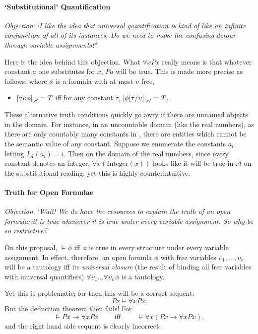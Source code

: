 \paragraph{`Substitutional' Quantification}

\emph{Objection}: `\emph{I like the idea that universal quantification is kind of like an infinite conjunction of all of its instances. Do we need to make the confusing detour through variable assignments?}'

Here is the idea behind this objection. What $\forall x Px$ really means is that whatever constant $a$ one substitutes for $x$, $Pa$ will be true. This is made more precise as follows: where $\phi$ is a formula with at most $\upsilon$ free, \begin{itemize}
	\item $\left|\forall \upsilon \phi\right|_{\mathscr{A}}=T$ iff for any constant $\tau$, $\left|\phi[\tau/\upsilon]\right|_{\mathscr{A}}=T$.
\end{itemize}
These alternative truth conditions quickly go awry if there are unnamed objects in the domain. For instance, in an uncountable domain (like the real numbers), as there are only countably many constants in \ltwo, there are entities which cannot be the semantic value of any constant. Suppose we enumerate the constants $a_{i}$, letting $I_{\mathscr{A}}(a_{i})=i$. Then on the domain of the real numbers, since every constant denotes an integer, $\forall x (\text{Integer}(x))$ looks like it will be true in $\mathscr{A}$ on the substitutional reading; yet this is highly counterintuitive.

\paragraph{Truth for Open Formulae}

\emph{Objection}: `\emph{Wait! We do have the resources to explain the truth of an open formula: it is true whenever it is true under every variable assignment. So why be so restrictive?}'

On this proposal, $\vDash \phi$ iff $\phi$ is true in every structure under every variable assignment. In effect, therefore, an open formula $\phi$ with free variables $\upsilon_{1},\ldots,\upsilon_{n}$ will be a tautology iff its \emph{universal closure} (the result of binding all free variables with universal quantifiers) $\forall\upsilon_{1}\ldots\forall\upsilon_{n}\phi$ is a tautology.

Yet this is problematic; for then this will be a correct sequent: \begin{equation*}
	Px \vDash \forall x Px.
\end{equation*}
But the deduction theorem then fails! For \begin{equation*}
	\vDash Px\to \forall x Px \qquad\text{ iff }\qquad \vDash\forall x (Px \to \forall x Px),
 \end{equation*} and the right hand side sequent is clearly incorrect.

